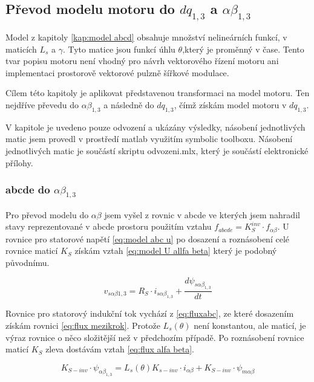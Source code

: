 \subsection{Převod modelu motoru do \texorpdfstring{$dq_{1,3}$}{dq1,3} a \texorpdfstring{$\alpha \beta_{1,3}$}{alpha beta 1,3}}
Model z kapitoly \ref{kap:model abcd} obsahuje množství nelineárních funkcí, v maticích $L_s$ a $\gamma$. Tyto matice jsou funkcí úhlu $\theta$,který je proměnný v čase. Tento tvar popisu motoru není vhodný pro návrh vektorového řízení motoru ani implementaci prostorově vektorové pulzně šířkové modulace. 

Cílem této kapitoly je aplikovat představenou transformaci na model motoru. Ten nejdříve převedu do $\alpha \beta_{1,3}$ a následně do $dq_{1,3}$, čímž získám model motoru v $dq_{1,3}$.

V kapitole je uvedeno pouze odvození a ukázány výsledky, násobení jednotlivých matic jsem provedl v prostředí matlab využitím symbolic toolboxu. Násobení jednotlivých matic je součástí skriptu odvozeni.mlx, který je součástí elektronické přílohy.

\subsubsection{abcde do \texorpdfstring{$\alpha \beta_{1,3}$}{alpha beta 1,3}}
Pro převod modelu do $\alpha \beta$ jsem vyšel z rovnic v abcde ve kterých jsem nahradil stavy reprezentované v abcde  prostoru použitím vztahu $f_{abcde}=K_{S}^{inv} \cdot f_{\alpha \beta}$.
U rovnice  pro statorové napětí \ref{eq:model abc u} po dosazení a roznásobení celé rovnice maticí $K_S$ získám vztah \ref{eq:model U allfa beta} který je podobný původnímu. 

\begin{equation}
    \label{eq:model U allfa beta}
    v_{s \alpha\beta{1,3}}=R_S \cdot i_{s \alpha \beta_{1,3}} + \frac{d\psi_{s\alpha \beta_{1,3}}}{dt}
\end{equation}

Rovnice pro statorový indukční tok vychází z \ref{eq:fluxabc}, ze které dosazením získám rovnici \ref{eq:flux mezikrok}. Protože $L_s(\theta)$ není konstantou, ale maticí, je výraz rovnice o něco složitější než v předchozím případě. Po roznásobení rovnice maticí $K_S$ zleva dostávám vztah \ref{eq:flux alfa beta}.



\begin{equation}
    \label{eq:flux mezikrok}
    K_{S-inv} \cdot \psi_{\alpha \beta_{1,3}}=
    L_s(\theta)K_{s-inv} \cdot i_{\alpha \beta}+ K_{S-inv} \cdot \psi_{m \alpha \beta}
\end{equation}

